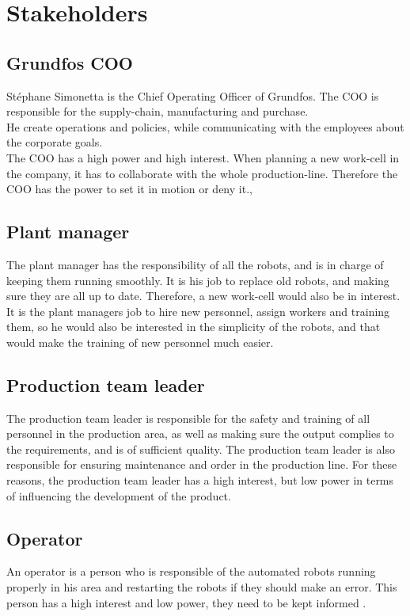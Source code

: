 \section{Stakeholders}


\subsection{Grundfos COO}\label{ch:grundfosas-CEO}
Stéphane Simonetta is the Chief Operating Officer of Grundfos. The COO is responsible for the supply-chain, manufacturing and purchase.\\ 
He create operations and policies, while communicating with the employees about the corporate goals.\\
The COO has a high power and high interest. When planning a new work-cell in the company, it has to collaborate with the whole production-line. Therefore the COO has the power to set it in motion or deny it.\cite{Grundfos},\cite{COO}\\

\subsection{Plant manager}\label{ch:Plant-manager} 
The plant manager has the responsibility of all the robots, and is in charge of keeping them running smoothly. It is his job to replace old robots, and making sure they are all up to date. Therefore, a new work-cell would also be in interest. It is the plant managers job to hire new personnel, assign workers and training them, so he would also be interested in the simplicity of the robots, and that would make the training of new personnel much easier. \cite{plantmanager} \\

\subsection{Production team leader}\label{ch:Production-team-leader}
The production team leader is responsible for the safety and training of all personnel in the production area, as well as making sure the output complies to the requirements, and is of sufficient quality. The production team leader is also responsible for ensuring maintenance and order in the production line. For these reasons, the production team leader has a high interest, but low power in terms of influencing the development of the product. \cite{Productionteamleader}


\subsection{Operator}\label{ch:grundfosemp-stake}
An operator is a person who is responsible of the automated robots running properly in his area and restarting the robots if they should make an error. This person has a high interest and low power, they need to be kept informed \cite{Operator}.\\

